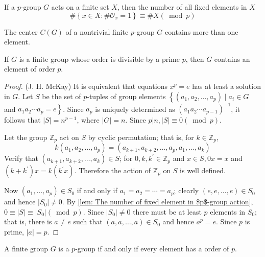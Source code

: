 \begin{lemma}
    \label{lem: The number of fixed element in $p$-group action}
    If a $p$-group $G$ acts on a finite set $X$, then the number of all fixed elements in $X$
    \begin{equation*}
        \#\left\{x\in X : \# \mathcal{O}_x=1\right\} \equiv \#X (\bmod p)
    \end{equation*}
\end{lemma}
\begin{corollary}
    The center $C(G)$ of a nontrivial finite $p$-group $G$ contains more than one element.
\end{corollary}
\begin{theorem}[Cauchy]
    If $G$ is a finite group whose order is divisible by a prime $p$, then $G$ contains an element of order $p$.
    \begin{proof}(J. H. McKay)
        It is equivalent that equations $x^p=e$ has at least a solution in $G$.
        Let $S$ be the set of $p$-tuples of group elements $\left\{\left(a_1, a_2, \ldots, a_p\right) \mid a_i \in G\right.$ and $\left.a_1 a_2 \cdots a_p=e\right\}$. Since $a_p$ is uniquely determined as $\left(a_1 a_2 \cdots a_{p-1}\right)^{-1}$, it follows that $|S|=n^{p-1}$, where $|G|=n$. Since $p|n,|S| \equiv 0(\bmod p)$.

        Let the group $\mathbb{Z}_p$ act on $S$ by cyclic permutation; that is, for $k \in \mathbb{Z}_p$,
        \begin{equation*}
            k\left(a_1, a_2, \ldots, a_p\right)
            =
            \left(a_{k+1}, a_{k+2}, \ldots, a_p, a_1, \ldots, a_k\right)
        \end{equation*}
        Verify that $\left(a_{k+1}, a_{k+2}, \ldots, a_k\right) \in S$; for $0, k, k^{\prime} \in \mathbb{Z}_p$ and $x \in S, 0 x=x$ and $\left(k+k^{\prime}\right) x=k\left(k^{\prime} x\right)$.
        Therefore the action of $\mathbb{Z}_p$ on $S$ is well defined.

        Now $\left(a_1, \ldots, a_p\right) \in S_0$ if and only if $a_1=a_2=\cdots=a_p$; clearly $(e, e, \ldots, e) \in S_0$ and hence $\left|S_0\right| \neq 0$. By \ref{lem: The number of fixed element in $p$-group action}, $0 \equiv|S| \equiv\left|S_0\right|(\bmod p)$. Since $\left|S_0\right| \neq 0$ there must be at least $p$ elements in $S_0$; that is, there is $a \neq e$ such that $(a, a, \ldots, a) \in S_0$ and hence $a^p=e$. Since $p$ is prime, $|a|=p$.
    \end{proof}
\end{theorem}
\begin{corollary}
    A finite group $G$ is a $p$-group if and only if every element has a order of $p$.
\end{corollary}


